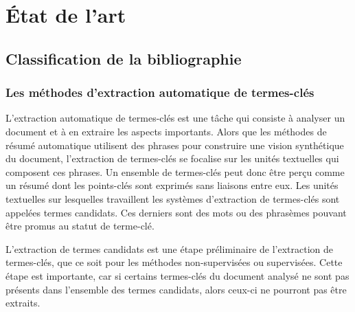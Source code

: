 \chapter{État de l'art}
\label{chap:etat_de_l_art}
  \section{Classification de la bibliographie}
  \subsection{Les méthodes d'extraction automatique de termes-clés}
  \label{sec:methods}
    L'extraction automatique de termes-clés est une tâche qui consiste à analyser
    un document et à en extraire les aspects importants. Alors que les méthodes de
    résumé automatique utilisent des phrases pour construire une vision
    synthétique du document, l'extraction de termes-clés se focalise sur les
    unités textuelles qui composent ces phrases. Un ensemble de termes-clés peut
    donc être perçu comme un résumé dont les points-clés sont exprimés sans
    liaisons entre eux. Les unités textuelles sur lesquelles travaillent les
    systèmes d'extraction de termes-clés sont appelées termes candidats. Ces
    derniers sont des mots ou des phrasèmes pouvant être promus au statut de
    terme-clé.

    L'extraction de termes candidats est une étape préliminaire de l'extraction de
    termes-clés, que ce soit pour les méthodes non-supervisées ou supervisées.
    Cette étape est importante, car si certains termes-clés du document analysé ne
    sont pas présents dans l'ensemble des termes candidats, alors ceux-ci ne
    pourront pas être extraits.

